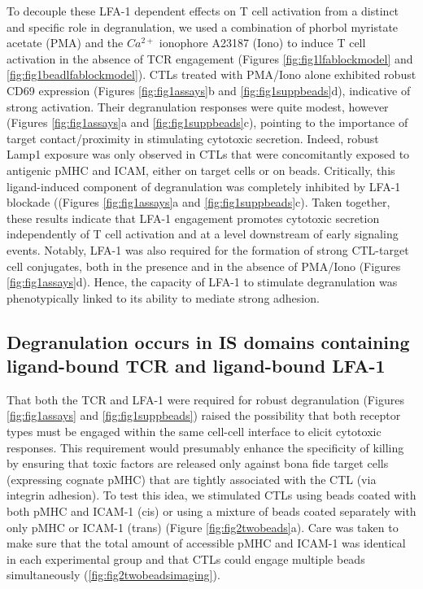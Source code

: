 To decouple these LFA-1 dependent effects on T cell activation from a distinct and specific role in degranulation, we used a combination of phorbol myristate acetate (PMA) and the $Ca^{2+}$ ionophore A23187 (Iono) to induce T cell activation in the absence of TCR engagement (Figures \ref{fig:fig1lfablockmodel} and \ref{fig:fig1beadlfablockmodel}). CTLs treated with PMA/Iono alone exhibited robust CD69 expression (Figures \ref{fig:fig1assays}b and \ref{fig:fig1suppbeads}d), indicative of strong activation. Their degranulation responses were quite modest, however (Figures \ref{fig:fig1assays}a and \ref{fig:fig1suppbeads}c), pointing to the importance of target contact/proximity in stimulating cytotoxic secretion. Indeed, robust Lamp1 exposure was only observed in CTLs that were concomitantly exposed to antigenic pMHC and ICAM, either on target cells or on beads. Critically, this ligand-induced component of degranulation was completely inhibited by LFA-1 blockade ((Figures \ref{fig:fig1assays}a and \ref{fig:fig1suppbeads}c). Taken together, these results indicate that LFA-1 engagement promotes cytotoxic secretion independently of T cell activation and at a level downstream of early signaling events. Notably, LFA-1 was also required for the formation of strong CTL-target cell conjugates, both in the presence and in the absence of PMA/Iono (Figures \ref{fig:fig1assays}d). Hence, the capacity of LFA-1 to stimulate degranulation was phenotypically linked to its ability to mediate strong adhesion. 

\subsection{Degranulation occurs in IS domains containing ligand-bound TCR and ligand-bound LFA-1}
That both the TCR and LFA-1 were required for robust degranulation (Figures \ref{fig:fig1assays} and \ref{fig:fig1suppbeads}) raised the possibility that both receptor types must be engaged within the same cell-cell interface to elicit cytotoxic responses. This requirement would presumably enhance the specificity of killing by ensuring that toxic factors are released only against bona fide target cells (expressing cognate pMHC) that are tightly associated with the CTL (via integrin adhesion). To test this idea, we stimulated CTLs using beads coated with both pMHC and ICAM-1 (cis) or using a mixture of beads coated separately with only pMHC or ICAM-1 (trans) (Figure \ref{fig:fig2twobeads}a). Care was taken to make sure that the total amount of accessible pMHC and ICAM-1 was identical in each experimental group and that CTLs could engage multiple beads simultaneously (\ref{fig:fig2twobeadsimaging}). 

